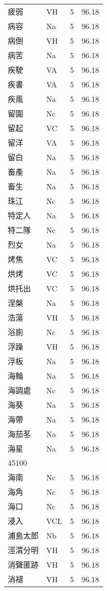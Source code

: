\documentclass[twocolumn]{book}
\begin{document}
\begin{supertabular}{llrr}
疲弱 & VH & 5 &  96.18\\
病容 & Na & 5 &  96.18\\
病倒 & VH & 5 &  96.18\\
病苦 & Na & 5 &  96.18\\
疾駛 & VA & 5 &  96.18\\
疾書 & VA & 5 &  96.18\\
疾風 & Na & 5 &  96.18\\
留園 & Nc & 5 &  96.18\\
留起 & VC & 5 &  96.18\\
留洋 & VA & 5 &  96.18\\
留白 & Na & 5 &  96.18\\
畜產 & Na & 5 &  96.18\\
畜生 & Na & 5 &  96.18\\
珠江 & Nc & 5 &  96.18\\
特定人 & Na & 5 &  96.18\\
特二隊 & Nc & 5 &  96.18\\
烈女 & Na & 5 &  96.18\\
烤焦 & VC & 5 &  96.18\\
烘烤 & VC & 5 &  96.18\\
烘托出 & VC & 5 &  96.18\\
涅槃 & Na & 5 &  96.18\\
浩蕩 & VH & 5 &  96.18\\
浴廁 & Nc & 5 &  96.18\\
浮躁 & VH & 5 &  96.18\\
浮板 & Na & 5 &  96.18\\
海輪 & Na & 5 &  96.18\\
海調處 & Nc & 5 &  96.18\\
海葵 & Na & 5 &  96.18\\
海帶 & Na & 5 &  96.18\\
海茄苳 & Na & 5 &  96.18\\
海星 & Na & 5 &  96.18\\
45100\\
海南 & Nc & 5 &  96.18\\
海角 & Nc & 5 &  96.18\\
海口 & Nc & 5 &  96.18\\
浸入 & VCL & 5 &  96.18\\
浦島太郎 & Nb & 5 &  96.18\\
涇渭分明 & VH & 5 &  96.18\\
消聲匿跡 & VH & 5 &  96.18\\
消褪 & VH & 5 &  96.18\\

\end{supertabular}
\end{document}

